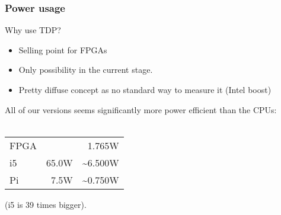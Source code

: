 \begin{frame}
  \frametitle{Power usage}
  \fontsize{8pt}{10}\selectfont
  Why use TDP?\\
  \begin{itemize}
    \item Selling point for FPGAs
    \item Only possibility in the current stage.
    \item Pretty diffuse concept as no standard way to measure it (Intel boost)
  \end{itemize}
  All of our versions seems significantly more power efficient than the CPUs:\\~\\
  \begin{tabular}{l r r}
    FPGA & & 1.765W\\
    i5 & 65.0W &\textasciitilde 6.500W \\
    Pi & 7.5W & \textasciitilde 0.750W
  \end{tabular}
  (i5 is 39 times bigger).
\end{frame}

